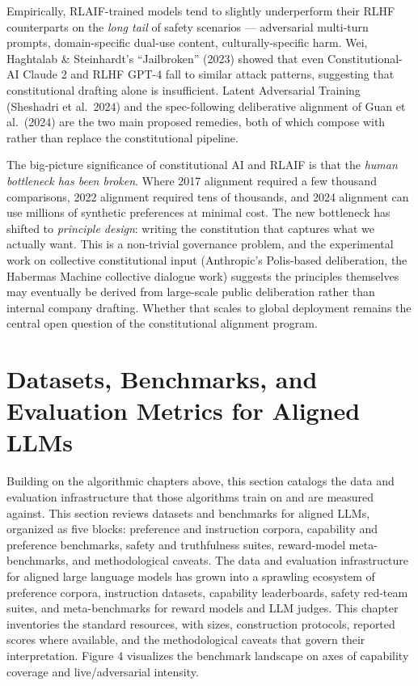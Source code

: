\documentclass{article}
\begin{document}
Empirically, RLAIF-trained models tend to slightly underperform their RLHF counterparts on the \emph{long tail} of safety scenarios --- adversarial multi-turn prompts, domain-specific dual-use content, culturally-specific harm. Wei, Haghtalab \& Steinhardt's ``Jailbroken'' (2023) showed that even Constitutional-AI Claude 2 and RLHF GPT-4 fall to similar attack patterns, suggesting that constitutional drafting alone is insufficient. Latent Adversarial Training (Sheshadri et al.~2024) and the spec-following deliberative alignment of Guan et al.~(2024) are the two main proposed remedies, both of which compose with rather than replace the constitutional pipeline.

The big-picture significance of constitutional AI and RLAIF is that the \emph{human bottleneck has been broken}. Where 2017 alignment required a few thousand comparisons, 2022 alignment required tens of thousands, and 2024 alignment can use millions of synthetic preferences at minimal cost. The new bottleneck has shifted to \emph{principle design}: writing the constitution that captures what we actually want. This is a non-trivial governance problem, and the experimental work on collective constitutional input (Anthropic's Polis-based deliberation, the Habermas Machine collective dialogue work) suggests the principles themselves may eventually be derived from large-scale public deliberation rather than internal company drafting. Whether that scales to global deployment remains the central open question of the constitutional alignment program.

\section{Datasets, Benchmarks, and Evaluation Metrics for Aligned LLMs}\label{datasets-benchmarks-and-evaluation-metrics-for-aligned-llms}

Building on the algorithmic chapters above, this section catalogs the data and evaluation infrastructure that those algorithms train on and are measured against. This section reviews datasets and benchmarks for aligned LLMs, organized as five blocks: preference and instruction corpora, capability and preference benchmarks, safety and truthfulness suites, reward-model meta-benchmarks, and methodological caveats. The data and evaluation infrastructure for aligned large language models has grown into a sprawling ecosystem of preference corpora, instruction datasets, capability leaderboards, safety red-team suites, and meta-benchmarks for reward models and LLM judges. This chapter inventories the standard resources, with sizes, construction protocols, reported scores where available, and the methodological caveats that govern their interpretation. Figure 4 visualizes the benchmark landscape on axes of capability coverage and live/adversarial intensity.
\end{document}
